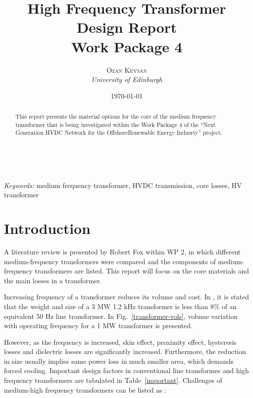 \documentclass[a4paper, 11pt]{article} %
\title{\textbf{High Frequency Transformer Design Report}\\ %
Work Package 4} %
\author{\textsc{Ozan Keysan} %
\\{\textit{University of Edinburgh}}} %
\date{\today} %
\makeatletter
\renewcommand{\maketitle}{ %
\begin{flushright} %
{\LARGE\@title} %

\vspace{50pt} %

{\large\@author} %
\\\@date %

\vspace{40pt} %
\end{flushright}
}
\makeatother
\begin{document}
\maketitle %



\begin{abstract}
This report presents the material options for the core of the medium frequency transformer that is being investigated within the Work Package 4 of the ``Next Generation HVDC Network for the OffshoreRenewable Energy Indusrty'' project. 
\end{abstract}

\hspace*{3,6mm}\textit{Keywords:} medium frequency transformer, HVDC transmission, core losses, HV transformer %

\vspace{30pt} %


\section{Introduction}


A literature review is presented by Robert Fox within WP 2, in which different medium-frequency transformers were compared and the components of medium-frequency transformers are listed. This report will focus on the core materials and the main losses in a transformer.

Increasing frequency of a transformer reduces its volume and cost. In \cite{Prasai2007}, it is stated that the weight and size of a 3 MW 1.2 kHz transformer is less than 8\% of an equivalent 50 Hz line transformer. In Fig.~\ref{transformer-vols}, volume variation with operating frequency for a 1 MW transformer is presented.

However, as the frequency is increased, skin effect, proximity effect, hysteresis losses and dielectric losses are significantly increased. Furthermore, the reduction in size usually implies same power loss in much smaller area, which demands forced cooling.
Important design factors in conventional line transformes and high frequency transformers are tabulated in Table~\ref{important}.
Challenges of medium-high frequency transformers can be listed as 
 \cite{Villar2010}:
\end{document}
